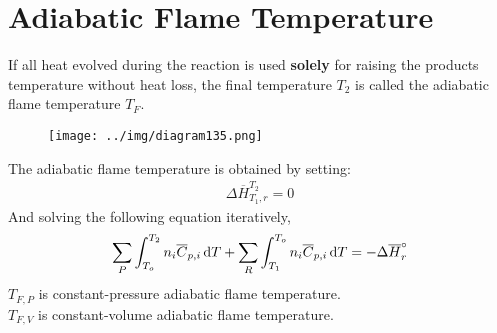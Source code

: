 \documentclass[class=report, crop=false, 12pt,a4paper]{standalone}
\numberwithin{equation}{section}
\begin{document}
\section{Adiabatic Flame Temperature}
If all heat evolved during the reaction is used \textbf{solely} for raising the products temperature without heat loss, the final temperature $T_2$ is called the adiabatic flame temperature $T_F$. 
\begin{figure}[H]
  \centering
  \texttt{[image: ../img/diagram135.png]}
  \caption{}
\end{figure}
The adiabatic flame temperature is obtained by setting:
\begin{gather}
  \Delta \overline{H}_{T_1,r}^{T_2} = 0
\end{gather}
And solving the following equation iteratively,
\begin{gather}
  \sum_{P}\int_{T_o}^{T_2}n_i\overline{C}_{p,i}\dif T + \sum_{R}\int_{T_1}^{T_o}n_i\overline{C}_{p,i}\dif T = -\Delta\overline{H}_{r}^\circ
\end{gather}
$T_{F,P}$ is constant-pressure adiabatic flame temperature. \\
$T_{F,V}$ is constant-volume adiabatic flame temperature.
\end{document}
